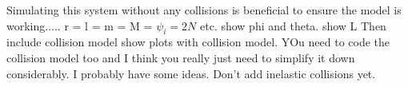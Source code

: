 \documentclass[]{aiaa-tc} %
\begin{document}
Simulating this system without any collisions is beneficial to ensure
the model is working.....
r =
l =
m =
M =
$\psi_i=2N$
etc.
show phi and theta.
show L
Then include collision model
show plots with collision model. YOu need to code the collision model
too and I think you really just need to simplify it down
considerably. I probably have some ideas. Don't add inelastic
collisions yet.
\end{document}

